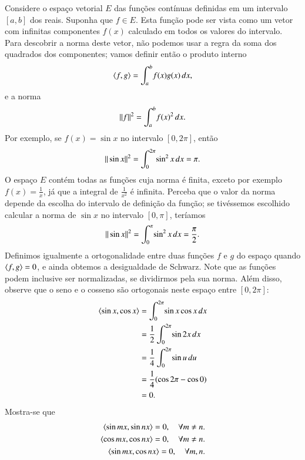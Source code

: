 Considere o espaço vetorial $E$ das funções contínuas definidas em um intervalo $[a,b]$ dos reais. Suponha que $f\in E$. Esta função pode ser vista como um vetor com infinitas componentes $f(x)$ calculado em todos os valores do intervalo. Para descobrir a norma deste vetor, não podemos usar a regra da soma dos quadrados dos componentes; vamos definir então o produto interno
\begin{equation*}
  \langle f, g \rangle = \int_a^b\! f(x)g(x)\, dx,
\end{equation*}
e a norma
\begin{equation*}
  \| f \|^2 = \int_a^b\! f(x)^2\, dx.
\end{equation*}
Por exemplo, se $f(x) = \sin{x}$ no intervalo $[0,2\pi]$, então 
\begin{equation*}
	\| \sin{x} \|^2 = \int_0^{2\pi} \! \sin^2{x} \,dx = \pi.
\end{equation*}
O espaço $E$ contém todas as funções cuja norma é finita, exceto por exemplo $f(x) = \frac{1}{x}$, já que a integral de $\frac{1}{x^2}$ é infinita. Perceba que o valor da norma depende da escolha do intervalo de definição da função; se tivéssemos escolhido calcular a norma de $\sin{x}$ no intervalo $[0,\pi]$, teríamos
\begin{align*}
	\| \sin{x} \|^2 = \int_{0}^{\pi} \! \sin^2{x} \, dx = \frac{\pi}{2}.
\end{align*}
Definimos igualmente a ortogonalidade entre duas funções $f$ e $g$ do espaço quando $\langle f, g \rangle=0$, e ainda obtemos a desigualdade de Schwarz. Note que as funções podem inclusive ser normalizadas, se dividirmos pela sua norma. Além disso, observe que o seno e o cosseno são ortogonais neste espaço entre $[0,2\pi]$:
\begin{align*}
  \langle \sin{x}, \cos{x} \rangle &= \int_0^{2\pi} \! \sin{x}\cos{x}\, dx \\
                        &= \frac{1}{2}\int_0^{2\pi} \! \sin{2x}\, dx \\
                        &= \frac{1}{4} \int_0^{2\pi}\! \sin{u} \, du \\
                        &= \frac{1}{4}(\cos{2\pi}-\cos{0}) \\
                        &= 0.
\end{align*}
Mostra-se que 
\begin{align*}
\langle \sin{mx}, \sin{nx} \rangle = 0, \quad \forall m\neq n.\\
\langle \cos{mx}, \cos{nx} \rangle = 0, \quad \forall m\neq n.\\
\langle \sin{mx}, \cos{nx} \rangle = 0, \quad \forall m,n.
\end{align*}



